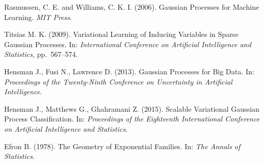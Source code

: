 \begin{thebibliography}{99}
	
	Rasmussen, C. E. and Williams, C. K. I. (2006). Gaussian Processes for Machine Learning. {\it MIT Press}.


	Titsias M. K. (2009).  Variational Learning of Inducing Variables in Sparse Gaussian
	Processes.  In: {\it International Conference on Artificial Intelligence and Statistics}, pp.~567–574.

	Hensman J., Fusi N., Lawrence D. (2013).  Gaussian Processes for Big Data.  In: {\it Proceedings of the Twenty-Ninth Conference on Uncertainty in Artificial Intelligence}.

	Hensman J., Matthews G., Ghahramani Z. (2015). Scalable Variational Gaussian Process Classification.  In: {\it Proceedings of the Eighteenth International Conference on Artificial Intelligence and Statistics}.

	Efron B. (1978). The Geometry of Exponential Families. In: {\it The Annals of Statistics}.


\end{thebibliography}	